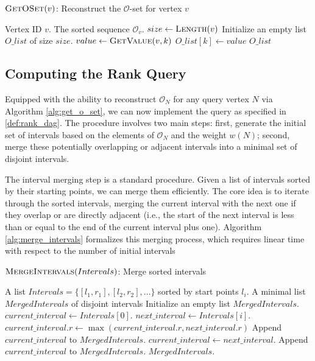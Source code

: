 \begin{algorithm}
    \caption{$\textsc{GetOSet}(v)$: Reconstruct the $\mathcal{O}$-set for vertex $v$}
    \label{alg:get_o_set}
    \small
    \begin{algorithmic}[1]
        \Require Vertex ID $v$.
        \Ensure The sorted sequence $\mathcal{O}_v$.
        \State $size \gets \textsc{Length}(v)$
        \State Initialize an empty list $O\_list$ of size $size$.
        \State $value \gets \textsc{GetValue}(v, k)$
        \State $O\_list[k] \gets value$
        \EndFor
        \State \Return $O\_list$
    \end{algorithmic}
\end{algorithm}

\subsection{Computing the Rank Query}
\label{subsec:computing_rank}

Equipped with the ability to reconstruct $\mathcal{O}_N$ for any query vertex $N$ via Algorithm \ref{alg:get_o_set}, we can now implement the \Rank{} query as specified in \ref{def:rank_dag}. The procedure involves two main steps: first, generate the initial set of intervals based on the elements of $\mathcal{O}_N$ and the weight $w(N)$; second, merge these potentially overlapping or adjacent intervals into a minimal set of disjoint intervals.

The interval merging step is a standard procedure. Given a list of intervals sorted by their starting points, we can merge them efficiently. The core idea is to iterate through the sorted intervals, merging the current interval with the next one if they overlap or are directly adjacent (i.e., the start of the next interval is less than or equal to the end of the current interval plus one). Algorithm \ref{alg:merge_intervals} formalizes this merging process, which requires linear time with respect to the number of initial intervals
\begin{algorithm}[htbp]
    \caption{$\textsc{MergeIntervals}(Intervals)$: Merge sorted intervals}
    \label{alg:merge_intervals}
    \small
    \begin{algorithmic}[1]
        \Require A list $Intervals = \{[l_1, r_1], [l_2, r_2], \dots\}$ sorted by start points $l_i$.
        \Ensure A minimal list $MergedIntervals$ of disjoint intervals
        \State Initialize an empty list $MergedIntervals$.
        \State $current\_interval \gets Intervals[0]$.
        \State $next\_interval \gets Intervals[i]$.
        \State $current\_interval.r \gets \max(current\_interval.r, next\_interval.r)$
        \Else
        \State Append $current\_interval$ to $MergedIntervals$.
        \State $current\_interval \gets next\_interval$.
        \EndIf
        \EndFor
        \State Append $current\_interval$ to $MergedIntervals$.
        \EndIf
        \State \Return $MergedIntervals$.
    \end{algorithmic}
\end{algorithm}


